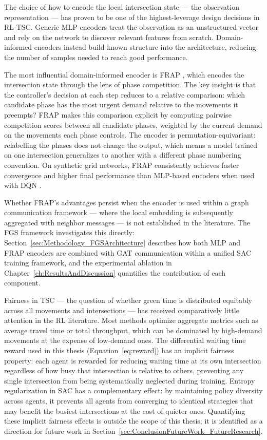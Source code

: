 The choice of how to encode the local intersection state — the observation representation — has proven to be one of the highest-leverage design decisions in RL-TSC. Generic MLP encoders treat the observation as an unstructured vector and rely on the network to discover relevant features from scratch. Domain-informed encoders instead build known structure into the architecture, reducing the number of samples needed to reach good performance.

The most influential domain-informed encoder is FRAP \citep{zheng2019learning}, which encodes the intersection state through the lens of phase competition. The key insight is that the controller's decision at each step reduces to a relative comparison: which candidate phase has the most urgent demand relative to the movements it preempts? FRAP makes this comparison explicit by computing pairwise competition scores between all candidate phases, weighted by the current demand on the movements each phase controls. The encoder is permutation-equivariant: relabelling the phases does not change the output, which means a model trained on one intersection generalizes to another with a different phase numbering convention. On synthetic grid networks, FRAP consistently achieves faster convergence and higher final performance than MLP-based encoders when used with DQN \citep{zheng2019learning}.

Whether FRAP's advantages persist when the encoder is used within a graph communication framework — where the local embedding is subsequently aggregated with neighbor messages — is not established in the literature. The FGS framework investigates this directly: Section~\ref{sec:Methodology_FGSArchitecture} describes how both MLP and FRAP encoders are combined with GAT communication within a unified SAC training framework, and the experimental ablation in Chapter~\ref{ch:ResultsAndDiscussion} quantifies the contribution of each component.

Fairness in TSC — the question of whether green time is distributed equitably across all movements and intersections — has received comparatively little attention in the RL literature. Most methods optimize aggregate metrics such as average travel time or total throughput, which can be dominated by high-demand movements at the expense of low-demand ones. The differential waiting time reward used in this thesis (Equation~\ref{eq:reward}) has an implicit fairness property: each agent is rewarded for reducing waiting time at its own intersection regardless of how busy that intersection is relative to others, preventing any single intersection from being systematically neglected during training. Entropy regularization in SAC has a complementary effect: by maintaining policy diversity across agents, it prevents all agents from converging to identical strategies that may benefit the busiest intersections at the cost of quieter ones. Quantifying these implicit fairness effects is outside the scope of this thesis; it is identified as a direction for future work in Section~\ref{sec:ConclusionFutureWork_FutureResearch}.


